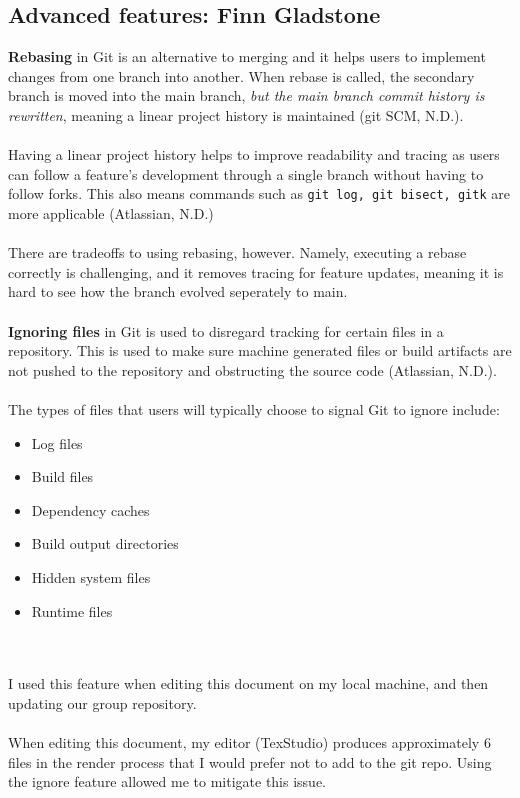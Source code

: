 \documentclass[a4paper, 11pt]{report}
\begin{document}
	\subsection{Advanced features: Finn Gladstone}

	\textbf{Rebasing} in Git is an alternative to merging and it helps users to implement changes from one branch into another. When rebase is called, the secondary branch is moved into the main branch, \textit{but the main branch commit history is rewritten}, meaning a linear project history is maintained (git SCM, N.D.).
	\\
	\\Having a linear project history helps to improve readability and tracing as users can follow a feature's development through a single branch without having to follow forks. This also means commands such as \texttt{git log, git bisect, gitk} are more applicable (Atlassian, N.D.)
	\\
	\\There are tradeoffs to using rebasing, however. Namely, executing a rebase correctly is challenging, and it removes tracing for feature updates, meaning it is hard to see how the branch evolved seperately to main.
	\\
	\\
	\textbf{Ignoring files} in Git is used to disregard tracking for certain files in a repository. This is used to make sure machine generated files or build artifacts are not pushed to the repository and obstructing the source code (Atlassian, N.D.).
	\\
	\\The types of files that users will typically choose to signal Git to ignore include:
	\begin{itemize}
	    \item Log files
	    \item Build files
	    \item Dependency caches
	    \item Build output directories
	    \item Hidden system files
	    \item Runtime files
	\end{itemize}
	\\
	\\I used this feature when editing this document on my local machine, and then updating our group repository.
	\\
	\\When editing this document, my editor (TexStudio) produces approximately 6 files in the render process that I would prefer not to add to the git repo. Using the ignore feature allowed me to mitigate this issue.
\end{document}
